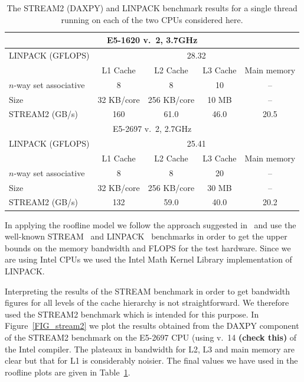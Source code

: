 \documentclass[12pt]{article}
\begin{document}
\begin{table}
\begin{tabular}{|l|c|c|c|c|}
\hline
  \multicolumn{5}{|c|}{E5-1620 v.~2, 3.7GHz} \\
  \hline
LINPACK (GFLOPS) & \multicolumn{4}{c|}{28.32} \\
\hline
&  L1 Cache & L2 Cache & L3 Cache & Main memory \\
$n$-way set associative & 8    & 8   & 10 & -- \\
Size                  &   32 KB/core   & 256 KB/core   & 10 MB    &  -- \\
\hline
STREAM2 (GB/s)   &  160  &  61.0  & 46.0 &  20.5 \\
  \hline
\multicolumn{5}{|c|}{E5-2697 v.~2, 2.7GHz}  \\
\hline
LINPACK (GFLOPS) & \multicolumn{4}{c|}{25.41} \\
\hline
               & L1 Cache & L2 Cache & L3 Cache & Main memory \\
$n$-way set associative & 8    & 8   & 20 & -- \\
Size           &   32 KB/core  & 256 KB/core   & 30 MB    &  -- \\
\hline
STREAM2 (GB/s) & 132      & 59.0     & 40.0     &  20.2 \\
\hline
\end{tabular}
\caption{The STREAM2 (DAXPY) and LINPACK benchmark results for a
  single thread running on each of the two CPUs considered here.}
\label{TAB_stream_linpack}
\end{table}

In applying the roofline model we follow the approach suggested
in~\cite{para_pearls} and use the well-known STREAM~\cite{stream} and
LINPACK~\cite{linpack} benchmarks in order to get the upper bounds on
the memory bandwidth and FLOPS for the test hardware. Since we are
using Intel CPUs we used the Intel Math Kernel Library implementation
of LINPACK.

Interpreting the results of the STREAM benchmark in order to get
bandwidth figures for all levels of the cache hierarchy is not
straightforward. We therefore used the STREAM2 benchmark which is
intended for this purpose. In Figure~\ref{FIG_stream2} we plot the
results obtained from the DAXPY component of the STREAM2 benchmark on
the E5-2697 CPU (using v.~14 {\bf (check this)} of the Intel
compiler. The plateaux in bandwidth for L2, L3 and main memory are
clear but that for L1 is considerably noisier. The final values we
have used in the roofline plots are given in
Table~\ref{TAB_stream_linpack}.
\end{document}
